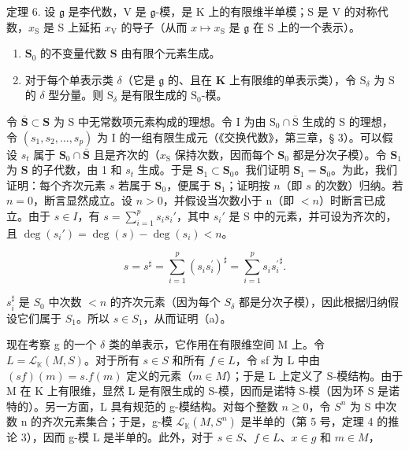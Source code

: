 定理 6. 设 \(\mathfrak{g}\) 是李代数，V 是 \(\mathfrak{g}\)-模，是 K 上的有限维半单模；S 是 V 的对称代数，\(x_{\mathrm{S}}\) 是 S 上延拓 \(x_{\mathrm{V}}\) 的导子（从而 \(x \mapsto x_{\mathrm{S}}\) 是 \(\mathfrak{g}\) 在 S 上的一个表示）。

\begin{enumerate}
\def\labelenumi{(\alph{enumi})}
\item
  \(\mathbf{S}_0\) 的不变量代数 \(\mathbf{S}\) 由有限个元素生成。
\item
  对于每个单表示类 \(\delta\)（它是 \(\mathfrak{g}\) 的、且在 \(\mathbf{K}\) 上有限维的单表示类），令 \(\mathrm{S}_{\delta}\) 为 \(\mathrm{S}\) 的 \(\delta\) 型分量。则 \(\mathrm{S}_{\delta}\) 是有限生成的 \(\mathrm{S}_{0}\)-模。
\end{enumerate}

令 \(\overline{\mathbf{S}}\subset \mathbf{S}\) 为 S 中无常数项元素构成的理想。令 I 为由 \(\mathrm{S}_0\cap \overline{\mathrm{S}}\) 生成的 S 的理想，令 \((s_1,s_2,\ldots ,s_p)\) 为 I 的一组有限生成元（《交换代数》，第三章，§ 3）。可以假设 \(s_t\) 属于 \(\mathbf{S}_0 \cap \bar{\mathbf{S}}\) 且是齐次的（\(x_{\mathrm{S}}\) 保持次数，因而每个 \(\mathbf{S}_0\) 都是分次子模）。令 \(\mathbf{S}_1\) 为 \(\mathbf{S}\) 的子代数，由 1 和 \(s_t\) 生成。于是 \(\mathbf{S}_1 \subset \mathbf{S}_0\)。我们证明 \(\mathbf{S}_1 = \mathbf{S}_0\)。为此，我们证明：每个齐次元素 \(s\) 若属于 \(\mathbf{S}_0\)，便属于 \(\mathbf{S}_1\)；证明按 \(n\)（即 \(s\) 的次数）归纳。若 \(n = 0\)，断言显然成立。设 \(n > 0\)，并假设当次数小于 n（即 \(< n\)）时断言已成立。由于 \(s \in I\)，有 \(s = \sum_{i=1}^{p} s_i s_i'\)，其中 \(s_i'\) 是 S 中的元素，并可设为齐次的，且 \(\deg(s_i') = \deg(s) - \deg(s_i) < n\)。

\[
s = s ^ {\sharp} = \sum_ {i = 1} ^ {p} (s _ {i} s _ {i} ^ {\prime}) ^ {\sharp} = \sum_ {i = 1} ^ {p} s _ {i} {s _ {i} ^ {\prime}} ^ {\sharp}.
\]

\(s_i^\sharp\) 是 \(S_0\) 中次数 \(< n\) 的齐次元素（因为每个 \(S_\delta\) 都是分次子模），因此根据归纳假设它们属于 \(S_1\)。所以 \(s \in S_1\)，从而证明（a）。

现在考察 g 的一个 \(\delta\) 类的单表示，它作用在有限维空间 M 上。令 \(L = \mathcal{L}_{\mathbb{K}}(M, S)\)。对于所有 \(s \in S\) 和所有 \(f \in L\)，令 sf 为 L 中由 \((sf)(m) = s.f(m)\) 定义的元素（\(m \in M\)）；于是 L 上定义了 S-模结构。由于 M 在 K 上有限维，显然 L 是有限生成的 S-模，因而是诺特 S-模（因为环 S 是诺特的）。另一方面，L 具有规范的 g-模结构。对每个整数 \(n \geqslant 0\)，令 \(S^{n}\) 为 S 中次数 n 的齐次元素集合；于是，g-模 \(\mathcal{L}_{\mathbb{K}}(M, S^{n})\) 是半单的（第 5 号，定理 4 的推论 3），因而 g-模 L 是半单的。此外，对于 \(s \in S\)、\(f \in L\)、\(x \in g\) 和 \(m \in M\)，

